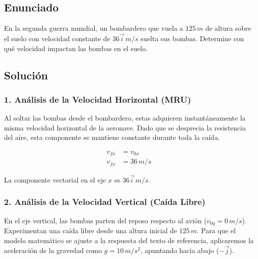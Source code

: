 \documentclass[12pt, a4paper]{article}
\begin{document}
\subsection*{Enunciado}
En la segunda guerra mundial, un bombardero que vuela a $125 \, \si{m}$ de altura sobre el suelo con velocidad constante de $36\vec{i} \, \si{m/s}$ suelta sus bombas. Determine con qué velocidad impactan las bombas en el suelo.
\begin{center}
\end{center}

\subsection*{Solución}

\subsubsection*{1. Análisis de la Velocidad Horizontal (MRU)}
Al soltar las bombas desde el bombardero, estas adquieren instantáneamente la misma velocidad horizontal de la aeronave. Dado que se desprecia la resistencia del aire, esta componente se mantiene constante durante toda la caída.

\begin{align*}
v_{fx} &= v_{0x} \\
v_{fx} &= 36 \, \si{m/s}
\end{align*}

La componente vectorial en el eje $x$ es $36\vec{i} \, \si{m/s}$.

\subsubsection*{2. Análisis de la Velocidad Vertical (Caída Libre)}
En el eje vertical, las bombas parten del reposo respecto al avión ($v_{0y} = 0 \, \si{m/s}$). Experimentan una caída libre desde una altura inicial de $125 \, \si{m}$. Para que el modelo matemático se ajuste a la respuesta del texto de referencia, aplicaremos la aceleración de la gravedad como $g = 10 \, \si{m/s^2}$, apuntando hacia abajo ($-\vec{j}$).
\end{document}
